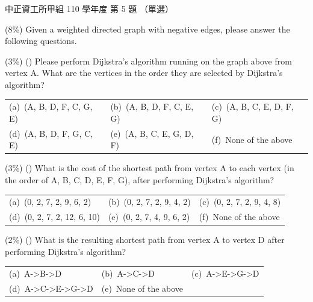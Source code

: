 \begin{pastexam}[label={px:ccu-110-swa-03}]{中正資工所甲組 110 學年度 第 5 題}
（單選）

(8\%) Given a weighted directed graph with negative edges, please answer the following
questions.

\begin{center}
\end{center}

 (3\%) (\quad) Please perform Dijkstra's algorithm running on the graph above from vertex A.
What are the vertices in the order they are selected by Dijkstra's algorithm?

\begin{tabular}{@{}lll@{}}
(a)~(A, B, D, F, C, G, E) & (b)~(A, B, D, F, C, E, G) & (c)~(A, B, C, E, D, F, G) \\
(d)~(A, B, D, F, G, C, E) & (e)~(A, B, C, E, G, D, F) & (f)~None of the above
\end{tabular}

 (3\%) (\quad) What is the cost of the shortest path from vertex A to each vertex (in the
order of A, B, C, D, E, F, G), after performing Dijkstra's algorithm?

\begin{tabular}{@{}lll@{}}
(a)~(0, 2, 7, 2, 9, 6, 2) & (b)~(0, 2, 7, 2, 9, 4, 2) & (c)~(0, 2, 7, 2, 9, 4, 8) \\
(d)~(0, 2, 7, 2, 12, 6, 10) & (e)~(0, 2, 7, 4, 9, 6, 2) & (f)~None of the above
\end{tabular}

 (2\%) (\quad) What is the resulting shortest path from vertex A to vertex D after performing
Dijkstra's algorithm?

\begin{tabular}{@{}lll@{}}
(a)~A->B->D & (b)~A->C->D & (c)~A->E->G->D \\
(d)~A->C->E->G->D & (e)~None of the above &
\end{tabular}
\end{pastexam}

